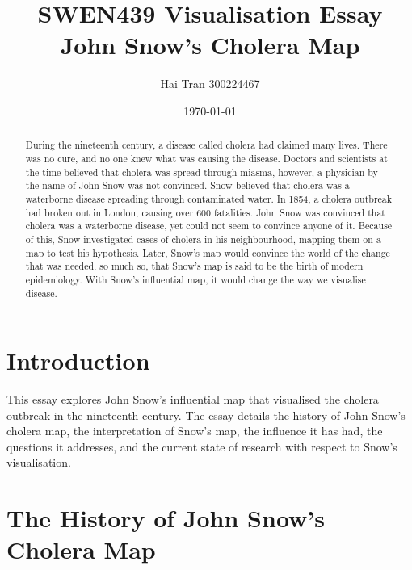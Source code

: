 \documentclass[12pt]{article}
\title{SWEN439 Visualisation Essay \\ John Snow's Cholera Map}
\author{Hai Tran 300224467}
\date{\today}
\begin{document}
\maketitle 

\begin{abstract}

During the nineteenth century, a disease called cholera had claimed many lives. There was no cure, and no one knew what was causing the disease. Doctors and scientists at the time believed that cholera was spread through miasma, however, a physician by the name of John Snow was not convinced. Snow believed that cholera was a waterborne disease spreading through contaminated water. In 1854, a cholera outbreak had broken out in London, causing over 600 fatalities. John Snow was convinced that cholera was a waterborne disease, yet could not seem to convince anyone of it. Because of this, Snow investigated cases of cholera in his neighbourhood, mapping them on a map to test his hypothesis. Later, Snow's map would convince the world of the change that was needed, so much so, that Snow's map is said to be the birth of modern epidemiology. With Snow's influential map, it would change the way we visualise disease. 

\end{abstract}

\section{Introduction}

This essay explores John Snow's influential map that visualised the cholera outbreak in the nineteenth century. The essay details the history of John Snow's cholera map, the interpretation of Snow's map, the influence it has had, the questions it addresses, and the current state of research with respect to Snow's visualisation.

\section{The History of John Snow's Cholera Map}
\end{document}
